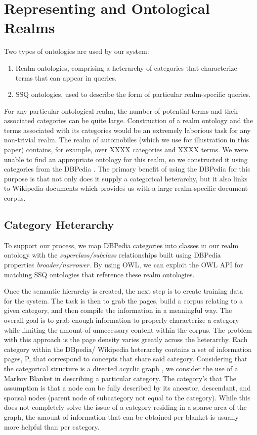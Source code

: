 \section{Representing and Ontological Realms}
Two types of ontologies are used by our system:
\begin{enumerate}
\item Realm ontologies, comprising a heterarchy of categories that
  characterize terms that can appear in queries.
\item SSQ ontologies, used to describe the form of particular
  realm-specific queries.
\end{enumerate}
For any particular ontological realm, the number of potential
terms and their associated categories can be quite large.
Construction of a realm ontology and the terms associated
with its categories would be an extremely laborious task
for any non-trivial realm. The realm of automobiles (which
we use for illustration in this paper) contains, for example,
over XXXX categories and XXXX terms. We were unable to find
an appropriate ontology for this realm, so we constructed it
using categories from the DBPedia \cite{Auer07dbpedia:a}.
The primary benefit of using the DBPedia for this purpose is
that not only does it supply a categorical heterarchy, but it
also links to Wikipedia documents which provides us with a large
realm-specific document corpus.

\subsection{Category Heterarchy} 

To support our process, we map DBPedia categories into classes in our realm ontology with the \textit{superclass/subclass} relationships built using DBPedia properties \textit{broader/narrower}. By using OWL, we can exploit the OWL API for matching SSQ ontologies that reference these realm ontologies.


Once the semantic hierarchy is created, the next step is to create
training data for the system. The task is then to grab the pages,
build a corpus relating to a given category, and then compile the
information in a meaningful way. The overall goal is to grab enough
information to properly characterize a category while limiting the
amount of unnecessary content within the corpus. The problem with this
approach is the page density varies greatly across the
heterarchy. Each category within the DBpedia/ Wikipedia heterarchy
contains a set of information pages, P, that correspond to concepts
that share said category. Considering that the categorical structure
is a directed acyclic graph \cite{Suchanek07yago:a}, we consider the
use of a Markov Blanket \cite{Friedman97bayesiannetwork} in describing
a particular category. The category's that The assumption is that a
node can be fully described by its ancestor, descendant, and spousal
nodes (parent node of subcategory not equal to the category). While
this does not completely solve the issue of a category residing in a
sparse area of the graph, the amount of information that can be
obtained per blanket is usually more helpful than per category.


